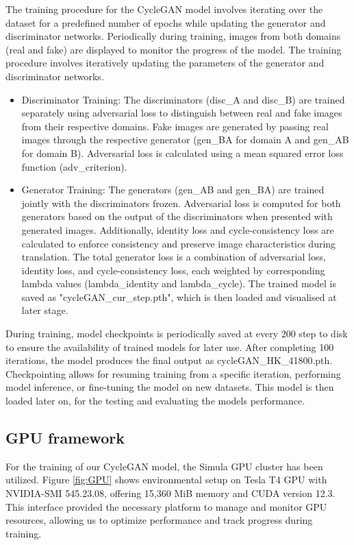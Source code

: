 \documentclass[UKenglish,12pt]{master-style}
\begin{document}
The training procedure for the CycleGAN model involves iterating over the dataset for a predefined number of epochs while updating the generator and discriminator networks. Periodically during training, images from both domains (real and fake) are displayed to monitor the progress of the model. The training procedure involves iteratively updating the parameters of the generator
and discriminator networks.
\begin{itemize}
\item Discriminator Training: The discriminators (disc\_A and disc\_B) are trained separately using adversarial loss to distinguish between real and fake images from their respective domains. Fake images are generated by passing real images through the respective generator (gen\_BA for domain A and gen\_AB for domain B). Adversarial loss is calculated using a mean squared error loss function (adv\_criterion).
\item Generator Training: The generators (gen\_AB and gen\_BA) are trained jointly with the discriminators frozen. Adversarial loss is computed for both generators based on the output of the discriminators when presented with generated images. Additionally, identity loss and cycle-consistency loss are calculated to enforce consistency and preserve image characteristics during translation. The total generator loss is a combination of adversarial loss, identity loss, and cycle-consistency loss, each weighted by corresponding lambda values (lambda\_identity and lambda\_cycle). The trained model is saved as "cycleGAN\_cur\_step.pth", which is then loaded and visualised at later stage.
\end{itemize}

During training, model checkpoints is periodically saved at every 200 step to disk to ensure the availability of trained models for later use. After completing 100 iterations, the model produces the final output as cycleGAN\_HK\_41800.pth. Checkpointing allows for resuming training from a specific iteration, performing model inference, or fine-tuning the model on new datasets. This model is then loaded later on, for the testing and evaluating the models performance.

\subsection{GPU framework}

For the training of our CycleGAN model, the Simula GPU cluster has been utilized. Figure \ref{fig:GPU} shows environmental setup on Tesla T4 GPU with NVIDIA-SMI 545.23.08, offering 15,360 MiB memory and CUDA version 12.3. This interface provided the necessary platform to manage and monitor GPU resources, allowing us to optimize performance and track progress during training.
 
\end{document}
